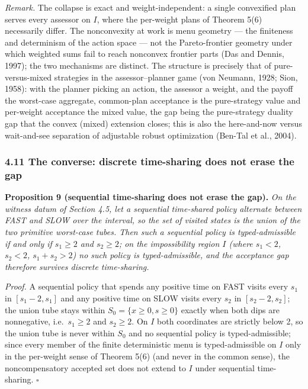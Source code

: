 \documentclass[11pt]{article}
\begin{document}
\emph{Remark.} The collapse is exact and weight-independent: a single
convexified plan serves every assessor on \(I\), where the per-weight
plans of Theorem 5(6) necessarily differ. The nonconvexity at work is
menu geometry --- the finiteness and determinism of the action space ---
not the Pareto-frontier geometry under which weighted sums fail to reach nonconvex frontier parts (Das and Dennis, 1997); the two mechanisms are distinct. The structure is precisely that of
pure-versus-mixed strategies in the assessor--planner game (von Neumann,
1928; Sion, 1958): with the planner picking an action, the assessor a
weight, and the payoff the worst-case aggregate, common-plan acceptance
is the pure-strategy value and per-weight acceptance the mixed value,
the gap being the pure-strategy duality gap that the convex (mixed)
extension closes; this is also the here-and-now versus wait-and-see
separation of adjustable robust optimization (Ben-Tal et al., 2004).

\subsubsection{4.11 The converse: discrete time-sharing does not erase
the
gap}\label{the-converse-discrete-time-sharing-does-not-erase-the-gap}

\textbf{Proposition 9 (sequential time-sharing does not erase the gap).}
\emph{On the witness datum of Section 4.5, let a sequential time-shared
policy alternate between FAST and SLOW over the interval, so the set of
visited states is the union of the two primitive worst-case tubes. Then
such a sequential policy is typed-admissible if and only if
\(s_1 \ge 2\) and \(s_2 \ge 2\); on the impossibility region \(I\)
(where \(s_1 < 2\), \(s_2 < 2\), \(s_1 + s_2 > 2\)) no such policy is
typed-admissible, and the acceptance gap therefore survives discrete
time-sharing.}

\emph{Proof.} A sequential policy that spends any positive time on FAST
visits every \(s_1\) in \([s_1 - 2, s_1]\) and any positive time on SLOW
visits every \(s_2\) in \([s_2 - 2, s_2]\); the union tube stays within
\(S_0 = \{x \ge 0, s \ge 0\}\) exactly when both dips are nonnegative,
i.e.~\(s_1 \ge 2\) and \(s_2 \ge 2\). On \(I\) both coordinates are
strictly below 2, so the union tube is never within \(S_0\) and no
sequential policy is typed-admissible; since every member of the finite
deterministic menu is typed-admissible on \(I\) only in the per-weight
sense of Theorem 5(6) (and never in the common sense), the
noncompensatory accepted set does not extend to \(I\) under sequential
time-sharing. \ensuremath{\square}
\end{document}
